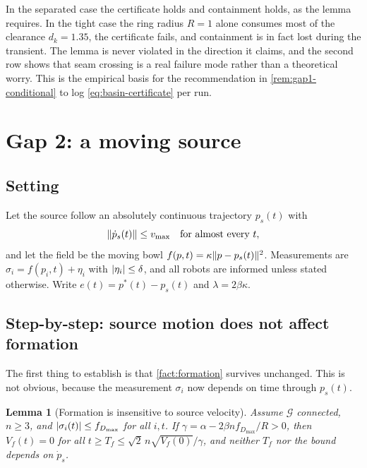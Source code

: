 \documentclass[11pt,a4paper]{article}
\theoremstyle{plain}
\newtheorem{lemma}{Lemma}
\theoremstyle{definition}
\newcommand{\G}{\mathcal{G}}
\DeclarePairedDelimiter{\norm}{\lVert}{\rVert}
\DeclarePairedDelimiter{\abs}{\lvert}{\rvert}
\newcommand{\NotationContext}[1]{\markboth{#1}{#1}}
\begin{document}
In the separated case the certificate holds and containment holds, as the lemma requires. In the
tight case the ring radius $R=1$ alone consumes most of the clearance $d_k=1.35$, the certificate
fails, and containment is in fact lost during the transient. The lemma is never violated in the
direction it claims, and the second row shows that seam crossing is a real failure mode rather
than a theoretical worry. This is the empirical basis for the recommendation in
\cref{rem:gap1-conditional} to log \eqref{eq:basin-certificate} per run.

\section{Gap 2: a moving source}\label{sec:gap2}
\NotationContext{moving}

\subsection{Setting}\label{sec:gap2-setting}

Let the source follow an absolutely continuous trajectory $p_s(t)$ with
\begin{equation}\label{eq:speed-bound}
    \norm{\dot p_s(t)}\leq v_{\max}\quad\text{for almost every }t,
\end{equation}
and let the field be the moving bowl $f(p,t)=\kappa\norm{p-p_s(t)}^2$. Measurements are
$\sigma_i=f(p_i,t)+\eta_i$ with $\abs{\eta_i}\leq\delta$, and all robots are informed unless
stated otherwise. Write $e(t)=p^*(t)-p_s(t)$ and $\lambda=2\beta\kappa$.

\subsection{Step-by-step: source motion does not affect formation}\label{sec:gap2-formation}

The first thing to establish is that \cref{fact:formation} survives unchanged. This is not
obvious, because the measurement $\sigma_i$ now depends on time through $p_s(t)$.

\begin{lemma}[Formation is insensitive to source velocity]\label{lem:formation-invariance}
Assume $\G$ connected, $n\geq3$, and $\abs{\sigma_i(t)}\leq f_{D_{\max}}$ for all $i,t$. If
$\gamma=\alpha-2\beta nf_{D_{\max}}/R>0$, then $V_f(t)=0$ for all
$t\geq T_f\leq\sqrt2\,n\sqrt{V_f(0)}/\gamma$, and neither $T_f$ nor the bound depends on
$\dot p_s$.
\end{lemma}
\end{document}
